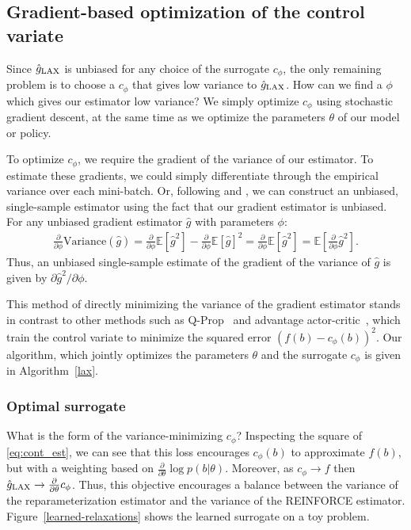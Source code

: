 \documentclass{article}
\newcommand{\E}{\mathbb{E}}
\newcommand{\PT}{\frac{\partial}{\partial \theta}}
\newcommand{\PPH}{\frac{\partial}{\partial \phi}}
\newcommand{\LAX}{{\textnormal{LAX}}}
\begin{document}
\subsection{Gradient-based optimization of the control variate}
Since $\hat g_\LAX$ is unbiased for any choice of the surrogate $c_\phi$, the only remaining problem is to choose a $c_\phi$ that gives low variance to $\hat g_\LAX$.
How can we find a $\phi$ which gives our estimator low variance?
We simply optimize $c_\phi$ using stochastic gradient descent, at the same time as we optimize the parameters $\theta$ of our model or policy.

To optimize $c_\phi$, we require the gradient of the variance of our estimator.
To estimate these gradients, we could simply differentiate through the empirical variance over each mini-batch.
Or, following \cite{ruiz2016overdispersed} and \cite{tucker2017rebar}, we can construct an unbiased, single-sample estimator using the fact that our gradient estimator is unbiased.
For any unbiased gradient estimator $\hat g$ with parameters $\phi$:
%
\begin{align}
\PPH \text{Variance}(\hat g)
= \PPH \E[\hat g^2] - \PPH \E[\hat g]^2
= \PPH \E[\hat g^2]
= \E \left[ \PPH \hat g^2 \right].
\label{eq:vargrad}
\end{align}  %
%
Thus, an unbiased single-sample estimate of the gradient of the variance of $\hat g$ is given by $\partial \hat g^2 / \partial \phi$.

This method of directly minimizing the variance of the gradient estimator stands in contrast to other methods such as Q-Prop~\citep{gu2016q} and advantage actor-critic~\citep{sutton2000policy}, which train the control variate to minimize the squared error $(f(b) - c_\phi(b))^2$.
Our algorithm, which jointly optimizes the parameters $\theta$ and the surrogate $c_\phi$ is given in Algorithm~\ref{lax}.

\subsubsection{Optimal surrogate}
What is the form of the variance-minimizing $c_\phi$?
Inspecting the square of \eqref{eq:cont_est}, we can see that this loss encourages $c_\phi(b)$ to approximate $f(b)$, but with a weighting based on $\PT\log p(b|\theta)$.  %
Moreover, as $c_\phi \rightarrow f$ then $\hat g_\textnormal{\LAX} \rightarrow \PT c_\phi$.
Thus, this objective encourages a balance between the variance of the reparameterization estimator and the variance of the REINFORCE estimator.
Figure~\ref{learned-relaxations} shows the learned surrogate on a toy problem.
\end{document}
